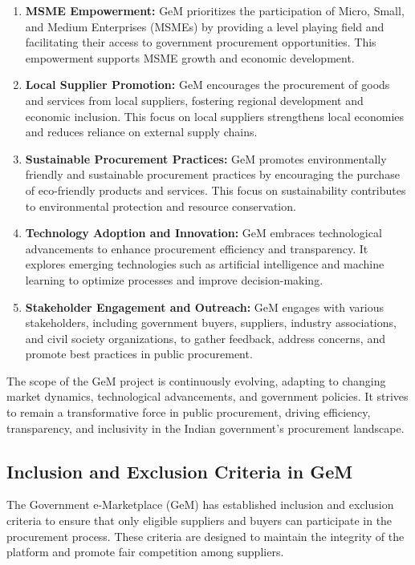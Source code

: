 \begin{enumerate}
    \item \textbf{MSME Empowerment:} GeM prioritizes the participation of Micro, Small, and Medium Enterprises (MSMEs) by providing a level playing field and facilitating their access to government procurement opportunities. This empowerment supports MSME growth and economic development.
    
    \item \textbf{Local Supplier Promotion:} GeM encourages the procurement of goods and services from local suppliers, fostering regional development and economic inclusion. This focus on local suppliers strengthens local economies and reduces reliance on external supply chains.
    
    \item \textbf{Sustainable Procurement Practices:} GeM promotes environmentally friendly and sustainable procurement practices by encouraging the purchase of eco-friendly products and services. This focus on sustainability contributes to environmental protection and resource conservation.
    
    \item \textbf{Technology Adoption and Innovation:} GeM embraces technological advancements to enhance procurement efficiency and transparency. It explores emerging technologies such as artificial intelligence and machine learning to optimize processes and improve decision-making.
    
    \item \textbf{Stakeholder Engagement and Outreach:} GeM engages with various stakeholders, including government buyers, suppliers, industry associations, and civil society organizations, to gather feedback, address concerns, and promote best practices in public procurement.
\end{enumerate}

The scope of the GeM project is continuously evolving, adapting to changing market dynamics, technological advancements, and government policies. It strives to remain a transformative force in public procurement, driving efficiency, transparency, and inclusivity in the Indian government's procurement landscape.


\subsection{Inclusion and Exclusion Criteria in GeM}

The Government e-Marketplace (GeM) has established inclusion and exclusion criteria to ensure that only eligible suppliers and buyers can participate in the procurement process. These criteria are designed to maintain the integrity of the platform and promote fair competition among suppliers.

